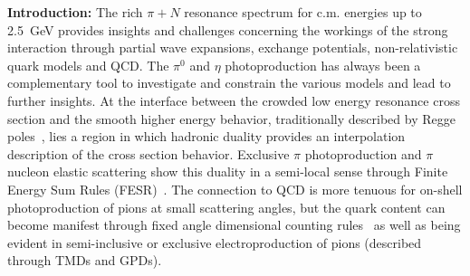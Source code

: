 \documentclass[aps,prc,twocolumn,floatfix,showpacs,preprintnumbers,amsmath,amssymb,superscriptaddress]{revtex4-1}
\begin{document}
\textbf{Introduction:} 
The rich $\pi + N$ resonance spectrum for c.m. energies up to 2.5~GeV provides insights and challenges concerning the workings of the strong interaction through partial wave expansions, exchange potentials, non-relativistic quark models and QCD. The $\pi^0$ and 
$\eta$ photoproduction has always been a complementary tool to investigate and constrain 
the various models and lead to further insights. At the interface between the crowded low energy resonance cross section and the smooth higher energy behavior, traditionally described by Regge poles~\cite{Ader}, lies a region in which hadronic duality provides an interpolation description of the cross section behavior. Exclusive $\pi$ photoproduction and $\pi$ nucleon elastic scattering show this duality in a semi-local sense through Finite Energy Sum Rules (FESR)~\cite{Armenian}. The connection to QCD is more tenuous for on-shell photoproduction of pions at small scattering angles, but the quark content can become manifest through fixed angle dimensional counting rules~\cite{Stan} as well as being evident in semi-inclusive or exclusive electroproduction of pions (described through TMDs and GPDs).
\end{document}
